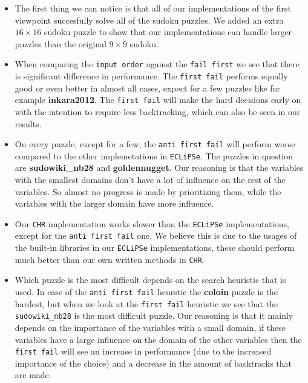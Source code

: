 \begin{itemize}
\item The first thing we can notice is that all of our implementations of the first viewpoint succesfully solve all of the sudoku puzzles. We added an extra $16 \times 16$ sudoku puzzle to show that our implementations can handle larger puzzles than the original $9 \times 9$ sudoku.
\item When comparing the \texttt{input order} against the \texttt{fail first} we see that there is significant difference in performance. The \texttt{first fail} performs equally good or even better in almost all cases, expect for a few puzzles like for example \textbf{inkara2012}. The \texttt{first fail} will make the hard decisions early on with the intention to require less backtracking, which can also be seen in our results.
\item On every puzzle, except for a few, the \texttt{anti first fail} will perform worse compared to the other implemetations in \texttt{ECLiPSe}. The puzzles in question are \textbf{sudowiki\_nb28} and \textbf{goldennugget}. Our reasoning is that the variables with the smallest domains don't have a lot of influence on the rest of the variables. So almost no progress is made by prioritizing them, while the variables with the larger domain have more influence.
\item Our \texttt{CHR} implementation works slower than the \texttt{ECLiPSe} implementations, except for the \texttt{anti first fail} one. We believe this is due to the usages of the built-in libraries in our \texttt{ECLiPSe} implementations, these should perform much better than our own written methods in \texttt{CHR}.
\item Which puzzle is the most difficult depends on the search heuristic that is used. In case of the \texttt{anti first fail} heurstic the \textbf{coloin} puzzle is the hardest, but when we look at the \texttt{first fail} heuristic we see that the \texttt{sudowiki\_nb28} is the most difficult puzzle. Our reasoning is that it mainly depends on the importance of the variables with a small domain, if these variables have a large influence on the domain of the other variables then the \texttt{first fail} will see an increase in performance (due to the increased importance of the choice) and a decrease in the amount of backtracks that are made. 
\end{itemize}

